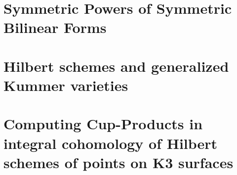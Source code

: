 \documentclass[11pt,twoside]{article}
\newcommand{\chapter}[1]{}
\begin{document}

\newpage
\part{Symmetric Powers of Symmetric Bilinear Forms}

\newpage
\part{Hilbert schemes and generalized Kummer varieties}
\chapter{Cohomology of Hilbert schemes of points on surfaces}






\label{integralcohomology}
\chapter{Cohomology of generalized Kummer manifolds}




\chapter{A quotient of the generalized Kummer fourfold}

\newpage
\part{Computing Cup-Products in integral cohomology of Hilbert schemes of points on K3 surfaces}
\chapter{Integral cohomology of \texorpdfstring{$S\hilb{n}$}{S[n]}}



\appendix
\chapter{Source code}


\clearpage

\newpage

\end{document}
